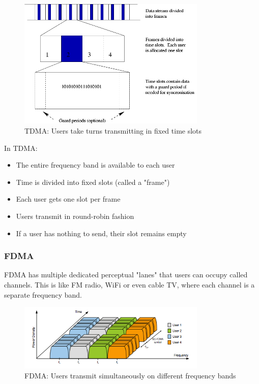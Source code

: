 \begin{figure}[h]
    \centering
    \includegraphics[width=0.8\textwidth]{assets/osi/physical/multiplexing/tdma.png}
    \caption{TDMA: Users take turns transmitting in fixed time slots}
    \label{fig:tdma}
\end{figure}

In TDMA:
\begin{itemize}
    \item The entire frequency band is available to each user
    \item Time is divided into fixed slots (called a "frame")
    \item Each user gets one slot per frame
    \item Users transmit in round-robin fashion
    \item If a user has nothing to send, their slot remains empty
\end{itemize}


\subsubsection{FDMA}
FDMA has multiple dedicated perceptual "lanes" that users can occupy called channels. This is like FM radio, WiFi or even cable TV, where each channel is a separate frequency band.

\begin{figure}[h]
    \centering
    \includegraphics[width=0.8\textwidth]{assets/osi/physical/multiplexing/fdma-sc.png}
    \caption{FDMA: Users transmit simultaneously on different frequency bands}
    \label{fig:fdma}
\end{figure}

